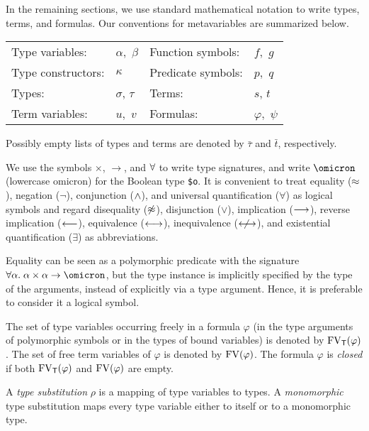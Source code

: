  In the remaining sections, we use standard
mathematical notation to write types, terms, and formulas. Our conventions
for metavariables are summarized below.
%
\begin{center}
\begin{tabular}{l@{\enskip}l@{\qquad}l@{\enskip}l}
Type variables: & $\alpha,$ $\beta$ &
  Function symbols: & $f,$ $g$ \\
Type constructors: & $\kappa$ &
  Predicate symbols: & $p,$ $q$ \\
Types: & $\sigma$, $\tau$ &
  Terms: & $s$, $t$ \\
Term variables: & $u,$ $v$ &
  Formulas: & $\varphi,$ $\psi$
\end{tabular}
\end{center}
%
Possibly empty lists of types and terms are denoted by $\bar{\tau}$ and
$\bar{t}$, respectively.

We use the symbols ${\times}$, ${\to}$, and ${\forall}$
to write type signatures, and write $\omicron$ (lowercase omicron) for the
Boolean type {\tt \$o}. It is convenient to treat
equality ($\approx$), negation ($\lnot$), conjunction ($\mathrel{\land}$), and universal
quantification ($\forall$) as logical symbols and regard disequality
($\not\approx$), disjunction ($\lor$), implication ($\longrightarrow$), reverse implication
($\longleftarrow$), equivalence ($\longleftrightarrow$), inequivalence ($\mathrel{\kern1.1ex\not\kern-1.1ex\longleftrightarrow}$), and existential
quantification ($\exists$) as abbreviations.

Equality can be seen as a polymorphic predicate with the signature
$\forall\alpha.\; \alpha\times\alpha\to\omicron$, but the type instance is
implicitly specified by the type of the arguments, instead of explicitly via a
type argument. Hence, it is preferable to consider it a logical
symbol.

The set of type variables occurring freely in a formula $\varphi$
(in the type arguments of polymorphic symbols or
in the types of bound variables) is denoted by $\mathrm{FV}_\mathsf{T}(\varphi)$.
The set of free term variables of $\varphi$
is denoted by $\mathrm{FV}(\varphi)$. The formula $\varphi$ is {\em closed\/}
if both $\mathrm{FV}_\mathsf{T}(\varphi)$ and $\mathrm{FV}(\varphi)$ are empty.

A {\em type substitution\/} $\rho$ is a mapping of type variables
to types. A {\em monomorphic\/} type substitution
maps every type variable either to itself or to a monomorphic type.
%
%
